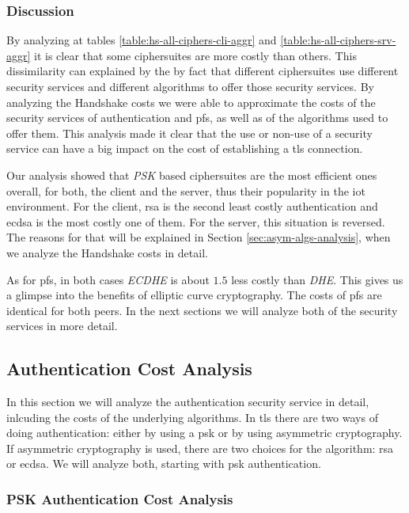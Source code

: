 \subsubsection{Discussion}

By analyzing at tables \ref{table:hs-all-ciphers-cli-aggr}
and \ref{table:hs-all-ciphers-srv-aggr} it is clear that some ciphersuites are more costly than others. This dissimilarity
can explained by the by fact that different ciphersuites use different security services and different algorithms to
offer those security services. By analyzing the Handshake costs we were able to approximate the costs of the security
services of authentication and \gls{pfs}, as well as of the algorithms used to offer them. This analysis made it clear that the
use or non-use of a security service can have a big impact on the cost of establishing a \gls{tls} connection.

Our analysis showed that \textit{PSK} based ciphersuites are the most efficient ones overall, for both, the client
and the server, thus their popularity in the \gls{iot} environment.
For the client, \gls{rsa} is the second least costly authentication and \gls{ecdsa}
is the most costly one of them. For the server, this situation is reversed. The reasons for that will be explained in
Section \ref{sec:asym-algs-analysis}, when we analyze the Handshake costs in detail.

As for \gls{pfs}, in both cases \textit{ECDHE} is about $1.5$ less costly than \textit{DHE}. This gives us a glimpse
into the benefits of elliptic curve cryptography. The costs of \gls{pfs} are identical for both peers. In the next
sections we will analyze both of the security services in more detail.

\subsection{Authentication Cost Analysis}

In this section we will analyze the authentication security service in detail, inlcuding the costs of the underlying algorithms.
In \gls{tls} there are two ways of doing authentication: either by using a \gls{psk} or by using asymmetric cryptography.
If asymmetric cryptography is used, there are two choices for the algorithm: \gls{rsa} or \gls{ecdsa}. We will analyze both,
starting with \gls{psk} authentication.

\subsubsection{PSK Authentication Cost Analysis} \label{sec:psk-cost-analysis}

